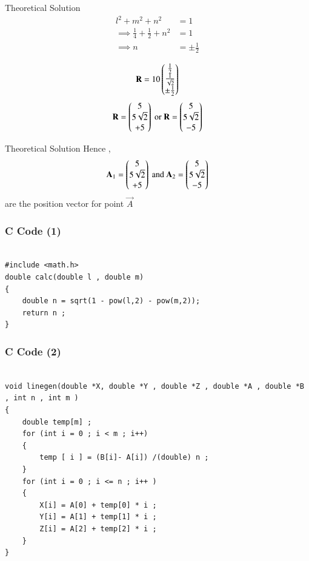 \documentclass{beamer}
\begin{document}
\begin{frame}{Theoretical Solution}
\begin{align}
    l^2 + m^2 + n^2 &= 1\\
    \implies \frac{1}{4} + \frac{1}{2} + n^2  &= 1\\
    \implies n &= \pm \frac{1}{2}
\end{align}

\begin{align}
    \mathbf{R} = 10\begin{pmatrix}\frac{1}{2} \\ \frac{1}{\sqrt{2}} \\ \pm \frac{1}{2}\end{pmatrix}
\end{align}
\begin{align}
    \mathbf{R} = \begin{pmatrix}5 \\ 5\sqrt{2} \\ +5\end{pmatrix} \text{ or } \mathbf{R} = \begin{pmatrix}5 \\ 5\sqrt{2} \\ -5\end{pmatrix} 
\end{align}
\end{frame}
\begin{frame}{Theoretical Solution}
Hence , 
\begin{align}
    \mathbf{A}_1 = \begin{pmatrix}5 \\ 5\sqrt{2} \\ +5\end{pmatrix} \text{ and } \mathbf{A}_2 = \begin{pmatrix}5 \\ 5\sqrt{2} \\ -5\end{pmatrix} 
\end{align}
are the position vector for point $\vec{A}$
  
\end{frame}
\begin{frame}[fragile]
    \frametitle{C Code (1) }

    \begin{lstlisting}

#include <math.h>
double calc(double l , double m)
{
    double n = sqrt(1 - pow(l,2) - pow(m,2));
    return n ;
}

    \end{lstlisting}
\end{frame}



\begin{frame}[fragile]
    \frametitle{C Code (2)}
    \begin{lstlisting}
    
void linegen(double *X, double *Y , double *Z , double *A , double *B , int n , int m )
{
    double temp[m] ; 
    for (int i = 0 ; i < m ; i++)
    {
        temp [ i ] = (B[i]- A[i]) /(double) n ; 
    }
    for (int i = 0 ; i <= n ; i++ )
    {
        X[i] = A[0] + temp[0] * i ; 
        Y[i] = A[1] + temp[1] * i ;
        Z[i] = A[2] + temp[2] * i ; 
    }
}

\end{lstlisting}
\end{frame}
\end{document}

